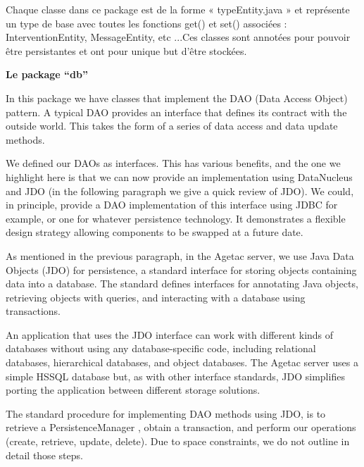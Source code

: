 \documentclass{article}
\begin{document}
{ Chaque classe dans ce package est de la forme « typeEntity.java 
» et représente un type de base avec toutes les fonctions get() et set() associées 
: InterventionEntity, MessageEntity, etc ...Ces classes sont annotées pour pouvoir 
être persistantes et ont pour unique but d'être stockées.}

\vspace{13pt}
{ \textbf{Le package ``db''}}

\vspace{13pt}
{ In this package we have classes that implement the DAO (Data Access 
Object) pattern. A typical DAO provides an interface that defines its contract 
with the outside world. This takes the form of a series of data access and data 
update methods. }

\vspace{13pt}
{ We defined our DAOs as interfaces. This has various benefits, 
and the one we highlight here is that we can now provide an implementation using 
DataNucleus and JDO (in the following paragraph we give a quick review of JDO). 
We could, in principle, provide a DAO implementation of this interface using JDBC 
for example, or one for whatever persistence technology. It demonstrates a flexible 
design strategy allowing components to be swapped at a future date.}

\vspace{13pt}
{ As mentioned in the previous paragraph, in the Agetac server, 
we use Java Data Objects (JDO) for persistence, a standard interface for storing 
objects containing data into a database. The standard defines interfaces for annotating 
Java objects, retrieving objects with queries, and interacting with a database 
using transactions. }

\vspace{13pt}
{ An application that uses the JDO interface can work with different 
kinds of databases without using any database-specific code, including relational 
databases, hierarchical databases, and object databases. The Agetac server uses 
a simple HSSQL database but, as with other interface standards, JDO simplifies 
porting the application between different storage solutions.}

\vspace{13pt}
{ The standard procedure for implementing DAO methods using JDO, 
is to retrieve a PersistenceManager , obtain a transaction, and perform our operations 
(create, retrieve, update, delete). Due to space constraints, we do not outline 
in detail those steps.}
\end{document}

